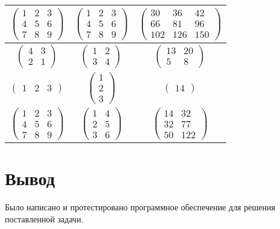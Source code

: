 \begin{table}[ht!]
\begin{center}
\begin{tabular}{|c|c|c|}
				\\ \hline
				$\begin{pmatrix}
					1 & 2 & 3\\
					4 & 5 & 6\\
					7 & 8 & 9
				\end{pmatrix}$ &
				$\begin{pmatrix}
					1 & 2 & 3\\
					4 & 5 & 6\\
					7 & 8 & 9
				\end{pmatrix}$ &
				$\begin{pmatrix}
					30 & 36 & 42\\
					66 & 81 & 96\\
					102 & 126 & 150
				\end{pmatrix}$ 
				
				\\ \hline
				$\begin{pmatrix}
					4 & 3 \\
					2 & 1 
				\end{pmatrix}$ &
				$\begin{pmatrix}
					1 & 2\\
					3 & 4
				\end{pmatrix}$ &
				$\begin{pmatrix}
					13 & 20 \\
					5 & 8 
				\end{pmatrix}$                  
				
				\\ \hline
				$\begin{pmatrix}
					1 & 2 & 3
				\end{pmatrix}$ &
				$\begin{pmatrix}
					1\\
					2\\
					3
				\end{pmatrix}$ &
				$\begin{pmatrix}
					14
				\end{pmatrix}$ 
				
				\\ \hline
				$\begin{pmatrix}
					1 & 2 & 3 \\
					4 & 5 & 6 \\
					7 & 8 & 9
				\end{pmatrix}$ &
				$\begin{pmatrix}
					1 & 4\\
					2 & 5\\
					3 & 6
				\end{pmatrix}$ &
				$\begin{pmatrix}
					14 & 32 \\
					32 & 77 \\
					50 & 122
				\end{pmatrix}$                  
				\\ \hline
			\end{tabular}
	\end{center}
\end{table}

\section*{Вывод}
Было написано и протестировано программное обеспечение для решения поставленной задачи.